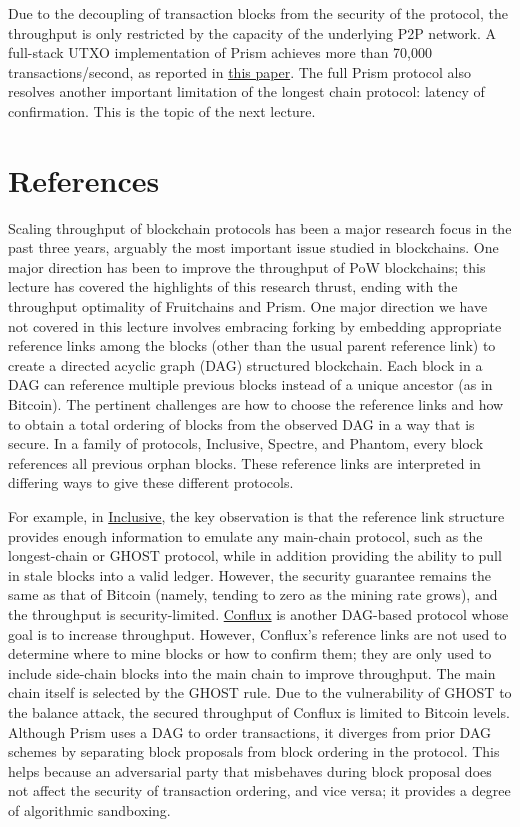 \documentclass{article}
\begin{document}
Due to the decoupling of transaction blocks from the security of the protocol, the throughput is only restricted by the capacity of the underlying P2P network. A full-stack UTXO implementation of {\sf Prism} achieves more than 70,000 transactions/second, as reported in \href{https://arxiv.org/pdf/1909.11261.pdf}{this paper}. The full {\sf Prism} protocol also resolves another important limitation of the longest chain protocol: latency of confirmation. This is the topic of the next lecture. 


\section*{References}

Scaling throughput of blockchain protocols has been a major research focus in the past three years, arguably the most important issue studied in blockchains. One major direction has been to improve the throughput of PoW blockchains; this lecture has covered the  highlights of this research thrust, ending with the throughput optimality of {\sf Fruitchains} and {\sf Prism}. One major direction we have not covered in this lecture involves   embracing forking by embedding appropriate reference links among the blocks (other than the usual parent reference link) to create a directed acyclic graph (DAG) structured blockchain.   Each block in a DAG can reference multiple previous blocks instead of a unique ancestor (as in Bitcoin). The pertinent challenges are how to choose the reference links and how to obtain a total ordering of blocks from the observed DAG in a way that is secure. In a family of protocols, {\sf Inclusive}, {\sf Spectre}, and {\sf Phantom}, every block references all previous orphan blocks. These reference links are interpreted in differing ways to give these different protocols. 

For example, in \href{https://fc15.ifca.ai/preproceedings/paper_101.pdf}{\sf Inclusive}, the key observation is that the reference link structure provides enough information to emulate any main-chain protocol, such as the longest-chain or {\sf GHOST} protocol, while in addition providing the ability to pull in stale blocks into a valid ledger. However, the security guarantee remains the same as that of {\sf Bitcoin} (namely, tending to zero as the mining rate grows), and the throughput is security-limited. 
\href{https://arxiv.org/pdf/1805.03870.pdf}{Conflux} is another DAG-based protocol whose goal is to increase throughput. However, {\sf Conflux}’s reference links are not used to determine where to mine blocks or how to confirm them; they are only used to include side-chain blocks into the main chain to improve throughput. The main chain itself is selected by the {\sf GHOST} rule. Due to the vulnerability of {\sf GHOST} to the balance attack, the secured throughput of {\sf Conflux} is limited to {\sf Bitcoin} levels. 
 Although {\sf Prism} uses a DAG to order transactions, it diverges from prior DAG schemes by separating block proposals from block ordering in the protocol. This helps because an adversarial party that misbehaves during block proposal does not affect the security of transaction ordering, and vice versa; it provides a degree of algorithmic sandboxing. 

 

\end{document}
